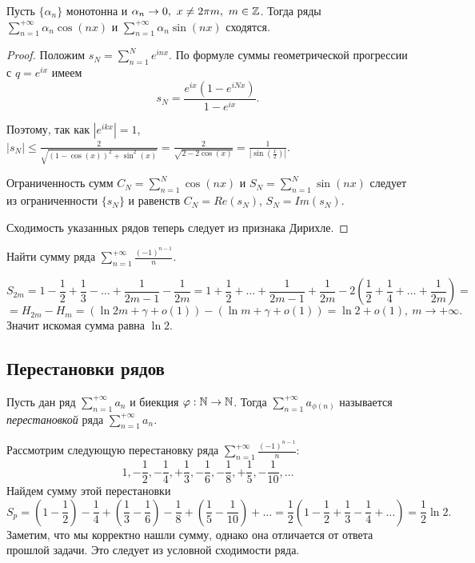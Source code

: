 \begin{corollary}
    Пусть $\{\alpha_{n}\}$ монотонна и $\alpha_{n} \to 0, \ x \neq 2\pi m, \ m \in \mathbb{Z}$. Тогда ряды
    $\sum_{n = 1}^{+ \infty} \alpha_{n}\cos(nx)$ и $\sum_{n = 1}^{+ \infty} \alpha_{n}\sin(nx)$ сходятся.
\end{corollary}

\begin{proof}
    Положим $s_{N} = \sum_{n = 1}^{N} e^{inx}$. По формуле суммы геометрической прогрессии с $q = e^{ix}$ имеем 
    \[s_{N} = \frac{e^{ix}(1 - e^{iNx})}{1 - e^{ix}}.\]
    
    Поэтому, так как $|e^{ikx}| = 1$, $|s_{N}| \leq \frac{2}{\sqrt{(1 - \cos(x))^{2} + \sin^2(x)}} = \frac{2}{\sqrt{2 - 2\cos(x)}} = \frac{1}{|\sin(\frac{x}{2})|}$.
    
    Ограниченность сумм $C_{N} = \sum_{n = 1}^{N} \cos(nx)$ и $S_{N} = \sum_{n = 1}^{N} \sin(nx)$ следует из ограниченности $\{s_{N}\}$ и равенств $C_{N} = Re(s_{N})$, $S_{N} = Im(s_{N})$.
    
    Сходимость указанных рядов теперь следует из признака Дирихле.
\end{proof}

\begin{example}
    Найти сумму ряда $\sum_{n = 1}^{+\infty} \frac{(-1)^{n - 1}}{n}$.
\end{example}

\begin{solution}
    \[S_{2m} = 1 - \frac{1}{2} + \frac{1}{3} - \ldots + \frac{1}{2m - 1} - \frac{1}{2m} = 1 + \frac{1}{2} + \ldots + \frac{1}{2m - 1} + \frac{1}{2m} - 2\left(\frac{1}{2} + \frac{1}{4} + \ldots + \frac{1}{2m}\right) = \]
    \[= H_{2m} - H_{m} = (\ln 2m + \gamma + o(1)) - (\ln m + \gamma + o(1)) = \ln 2 + o(1), \ m \to +\infty.\]
    Значит искомая сумма равна $\ln 2$.
\end{solution}

\subsection{Перестановки рядов}

\begin{definition}
    Пусть дан ряд $\sum_{n = 1}^{+\infty} a_{n}$ и биекция $\varphi: \mathbb{N} \to \mathbb{N}$. Тогда $\sum_{n = 1}^{+\infty}a_{\phi(n)}$ называется \textit{перестановкой} ряда $\sum_{n = 1}^{+\infty} a_{n}$.
\end{definition}

\begin{example}
    Рассмотрим следующую перестановку ряда $\sum_{n = 1}^{+\infty} \frac{(-1)^{n - 1}}{n}$:
    \[1, - \frac{1}{2}, -\frac{1}{4}, + \frac{1}{3}, - \frac{1}{6}, - \frac{1}{8}, + \frac{1}{5}, - \frac{1}{10}, \ldots\]
    Найдем сумму этой перестановки
    \[S_{p} = (1 - \frac{1}{2}) -\frac{1}{4} + (\frac{1}{3} - \frac{1}{6}) - \frac{1}{8} + (\frac{1}{5} - \frac{1}{10}) + \ldots = \frac{1}{2}(1 - \frac{1}{2} + \frac{1}{3} - \frac{1}{4} + \ldots) = \frac{1}{2} \ln 2.\]
    Заметим, что мы корректно нашли сумму, однако она отличается от ответа прошлой задачи. Это следует из условной сходимости ряда.
\end{example}


